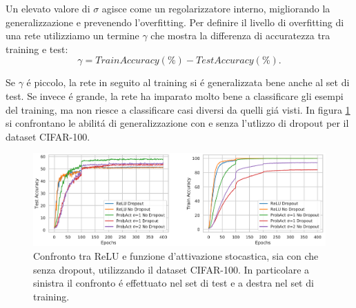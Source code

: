 \documentclass[a4paper,10pt]{article}
\begin{document}
  Un elevato valore di $\sigma$ agisce come un regolarizzatore interno, migliorando la generalizzazione e prevenendo l'overfitting. Per definire il livello di overfitting di una rete utilizziamo un termine $\gamma$ che mostra la differenza di accuratezza tra training e test:
  \begin{equation}
   \gamma = TrainAccuracy(\%) - TestAccuracy(\%).
  \end{equation}
  
  Se $\gamma$ \'e piccolo, la rete in seguito al training si \'e generalizzata bene anche al set di test. Se invece \'e grande, la rete ha imparato molto bene a classificare gli esempi del training, ma non riesce a classificare casi diversi da quelli gi\'a visti. In figura \ref{WithWithoutDropoutpng} si confrontano le abilit\'a di generalizzazione con e senza l'utlizzo di dropout per il dataset CIFAR-100. 
  \begin{figure}[h!]
   \centering
   \includegraphics[width=\linewidth]{WithWithoutDropout.png} 
   \caption{Confronto tra ReLU e funzione d'attivazione stocastica, sia con che senza dropout, utilizzando il dataset CIFAR-100. In particolare a sinistra il confronto \'e effettuato nel set di test e a destra nel set di training.}
  \label{WithWithoutDropoutpng}
  \end{figure} 
  
\end{document}
